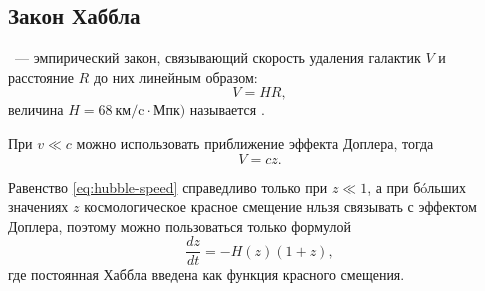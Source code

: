 \subsection{Закон Хаббла}
~--- эмпирический закон, связывающий скорость удаления галактик $V$ и расстояние $R$ до них линейным образом: 
\begin{equation}
	V = H R,
\end{equation}
величина $H=68~\text{км/c} \cdot \text{Мпк})$ называется .

При $v \ll c$ можно использовать приближение эффекта Доплера, тогда
\begin{equation}
	V = c z.
\label{eq:hubble-speed}
\end{equation}

Равенство \eqref{eq:hubble-speed} справедливо только при $z \ll 1$, а при б\'{o}льших значениях $z$ космологическое красное смещение нльзя связывать с эффектом Доплера, поэтому можно пользоваться только формулой 
\begin{equation}
	\frac{dz}{dt} = - H(z)(1+z),
\end{equation}
где постоянная Хаббла введена как функция красного смещения.